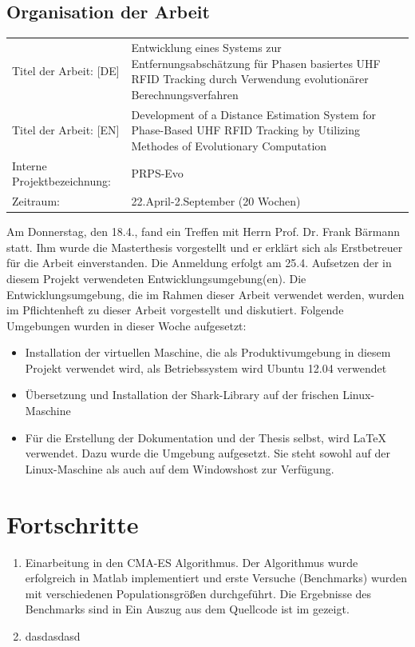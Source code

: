 \documentclass[a4paper,12pt,fleqn]{scrartcl}
\begin{document}
\subsection{Organisation der Arbeit}
\begin{table}[right]
    \renewcommand{\arraystretch}{1.5}
    \begin{tabular}{lp{11cm}}
      Titel der Arbeit:  [DE]		&	Entwicklung eines Systems zur
Entfernungsabschätzung für Phasen basiertes
      UHF RFID Tracking durch Verwendung evolutionärer Berechnungsverfahren \\
      Titel der Arbeit:  [EN]		&	Development of a Distance
Estimation System for Phase-Based UHF RFID
      Tracking by Utilizing Methodes of Evolutionary Computation \\
      Interne Projektbezeichnung:	&	PRPS-Evo\\
      Zeitraum:				&	22.April-2.September (20 Wochen)
    \end{tabular}
\end{table}
%
Am Donnerstag, den 18.4., fand ein Treffen mit Herrn Prof.
Dr. Frank Bärmann statt. Ihm wurde die Masterthesis vorgestellt und er erklärt
sich als Erstbetreuer für die Arbeit einverstanden.
\newline
%
Die Anmeldung erfolgt am 25.4.
\newline
%
Aufsetzen der in diesem Projekt verwendeten Entwicklungsumgebung(en). Die
Entwicklungsumgebung, die im Rahmen dieser Arbeit verwendet werden, wurden im
Pflichtenheft zu dieser Arbeit vorgestellt und diskutiert.
\newline
%
Folgende Umgebungen wurden in dieser Woche aufgesetzt:
\begin{itemize}
  \item Installation der virtuellen Maschine, die als Produktivumgebung in
diesem
Projekt verwendet wird, als Betriebssystem wird Ubuntu 12.04 verwendet
  \item Übersetzung und Installation der Shark-Library auf der frischen
  Linux-Maschine
  \item Für die Erstellung der Dokumentation und der Thesis selbst, wird
\LaTeX{} verwendet.
  Dazu wurde die Umgebung aufgesetzt. Sie steht sowohl auf der Linux-Maschine
als auch auf dem Windowshost zur Verfügung.
\end{itemize}

\section[Fortschritte]{Fortschritte}
\begin{enumerate}
 \item Einarbeitung in den CMA-ES Algorithmus. Der Algorithmus wurde erfolgreich
in Matlab
      implementiert und erste Versuche (Benchmarks) wurden mit verschiedenen
Populationsgrößen durchgeführt. Die Ergebnisse des Benchmarks sind in
      Ein Auszug aus dem Quellcode ist im  gezeigt.
 \item
        dasdasdasd
\end{enumerate}
\end{document}
